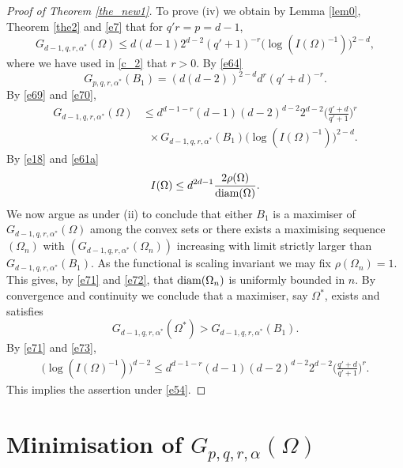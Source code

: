 \documentclass[a4paper,9pt]{article}
\newcommand{\Om}{\Omega}
\begin{document}
\begin{proof}[Proof of Theorem \ref{the_new1}]
To prove (iv) we obtain by Lemma \ref{lem0}, Theorem \ref{the2} and \eqref{e7} that for $q'r=p=d-1$,
\begin{equation}\label{e69}
G_{d-1,q,r,\alpha^*}(\Om)\le d(d-1)2^{d-2}(q'+1)^{-r}\Big(\log(I(\Om)^{-1})\Big)^{2-d},
\end{equation}
where we have used in \eqref{c_2} that $r>0$. By \eqref{e64}
\begin{equation} \label{e70}
G_{p,q,r,\alpha^*}(B_1)=(d(d-2))^{2-d}d^r(q'+d)^{-r}.
\end{equation}
By \eqref{e69} and \eqref{e70},
\begin{align}\label{e71}
G_{d-1,q,r,\alpha^*}(\Om)&\le d^{d-1-r}(d-1)(d-2)^{d-2}2^{d-2}\Big(\frac{q'+d}{q'+1}\Big)^r\nonumber\\& \,\,\ \times G_{d-1,q,r,\alpha^*}(B_1)\Big(\log(I(\Om)^{-1})\Big)^{2-d}.
\end{align}
By \eqref{e18} and \eqref{e61a}
\begin{equation}\label{e72}
I(\Om)\le d^{2d-1}\frac{2\rho(\Om)}{\textup{diam}(\Om)}.
\end{equation}
We now argue as under (ii) to conclude that either $B_1$ is a maximiser of $G_{d-1,q,r,\alpha^*}(\Om)$ among the convex sets or there exists a maximising sequence $(\Om_n)$ with
$(G_{d-1,q,r,\alpha^*}(\Om_n))$ increasing with limit strictly larger than  $G_{d-1,q,r,\alpha^*}(B_1)$. As the functional is scaling invariant we may fix $\rho(\Om_n)=1$.
This gives, by \eqref{e71} and \eqref{e72}, that $\textup{diam}(\Om_n)$ is uniformly bounded in $n$. By convergence and continuity we conclude that a maximiser, say $\Om^*$, exists and satisfies
\begin{equation}\label{e73}
G_{d-1,q,r,\alpha^*}(\Om^*)>G_{d-1,q,r,\alpha^*}(B_1).
\end{equation}
By \eqref{e71} and \eqref{e73},
\begin{align*}%
\Big(\log(I(\Om)^{-1})\Big)^{d-2}\le d^{d-1-r}(d-1)(d-2)^{d-2}2^{d-2}\Big(\frac{q'+d}{q'+1}\Big)^r.
\end{align*}
This implies the assertion under \eqref{e54}.
\end{proof}

\section{Minimisation of $G_{p,q,r,\alpha}(\Omega)$}\label{sec4}
\end{document}
